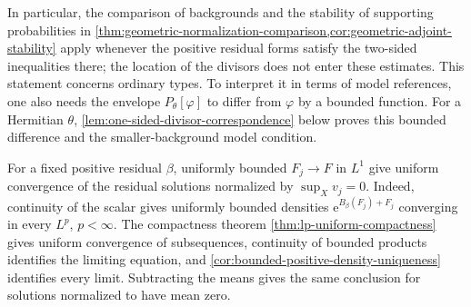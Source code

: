 In particular, the comparison of backgrounds and the stability of supporting probabilities in \cref{thm:geometric-normalization-comparison,cor:geometric-adjoint-stability} apply whenever the positive residual forms satisfy the two-sided inequalities there; the location of the divisors does not enter these estimates. This statement concerns ordinary types. To interpret it in terms of model references, one also needs the envelope $P_\theta[\varphi]$ to differ from $\varphi$ by a bounded function. For a Hermitian $\theta$, \cref{lem:one-sided-divisor-correspondence} below proves this bounded difference and the smaller-background model condition.

For a fixed positive residual $\beta$, uniformly bounded $F_j\to F$ in $L^1$ give uniform convergence of the residual solutions normalized by $\sup_Xv_j=0$. Indeed, continuity of the scalar gives uniformly bounded densities $\mathrm{e}^{B_\beta(F_j)+F_j}$ converging in every $L^p$, $p<\infty$. The compactness theorem \cref{thm:lp-uniform-compactness} gives uniform convergence of subsequences, continuity of bounded products identifies the limiting equation, and \cref{cor:bounded-positive-density-uniqueness} identifies every limit. Subtracting the means gives the same conclusion for solutions normalized to have mean zero.

